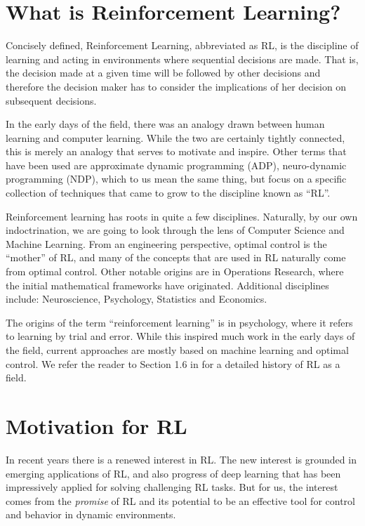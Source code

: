 \section{What is Reinforcement Learning?}

Concisely defined, Reinforcement Learning, abbreviated as RL, is the discipline of learning and acting in 
environments where sequential decisions are made. That is, the decision made at a given time 
will be followed by other decisions and therefore the decision maker has to consider the implications 
of her decision on subsequent decisions. 

In the early days of the field, there was an analogy drawn between human learning and computer 
learning. While the two are certainly tightly connected, this is merely an analogy that serves to motivate and inspire. Other terms that 
have been used are approximate dynamic programming (ADP), neuro-dynamic programming (NDP), which to us
mean the same thing, but focus on a specific collection of techniques that came to grow to the discipline known as ``RL''.

 \medskip
{}
%
Reinforcement learning has roots in quite a few disciplines.
Naturally, by our own indoctrination, we are going to look through the lens of Computer Science
and Machine Learning. From an engineering perspective, optimal control is 
the ``mother'' of RL, and many of the concepts that are used in RL naturally come from optimal control. 
Other notable origins are in Operations Research, where the initial mathematical frameworks have originated.
Additional disciplines include: Neuroscience, Psychology, Statistics and
Economics.

The origins of the term ``reinforcement learning'' is in psychology, where it refers to learning by trial and error. 
While this inspired much work in the early days of the field, current approaches are mostly based on
machine learning and optimal control. We refer the reader to Section 1.6 in \cite{SuttonB98} for 
a detailed history of RL as a field. 

\section{Motivation for RL}

In recent years there is a renewed interest in RL. The new interest is grounded in  emerging applications
of RL, and also progress of deep learning that
has been impressively applied for solving challenging RL tasks. 
But for us, the interest comes from the {\em promise} of RL and its
potential to be an effective tool for control and behavior in dynamic environments.


